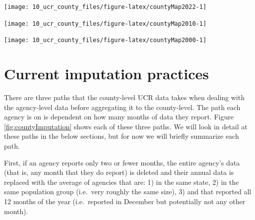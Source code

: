 \documentclass[
]{krantz}
\let\origfigure\figure
\let\endorigfigure\endfigure
\renewenvironment{figure}[1][2] {
    \expandafter\origfigure\expandafter[H]
} {
    \endorigfigure
}
\begin{document}
\begin{figure}

{\centering \texttt{[image: 10\_ucr\_county\_files/figure-latex/countyMap2022-1]} 

}

\caption{The share of the population in each county covered by an agency reporting 12 months of data based on their last month reported being December, 2022.}\label{fig:countyMap2022}
\end{figure}

\begin{figure}

{\centering \texttt{[image: 10\_ucr\_county\_files/figure-latex/countyMap2010-1]} 

}

\caption{The share of the population in each county covered by an agency reporting 12 months of data based on their last month reported being December, 2010.}\label{fig:countyMap2010}
\end{figure}

\begin{figure}

{\centering \texttt{[image: 10\_ucr\_county\_files/figure-latex/countyMap2000-1]} 

}

\caption{The share of the population in each county covered by an agency reporting 12 months of data based on their last month reported being December, 2000.}\label{fig:countyMap2000}
\end{figure}

\section{Current imputation
practices}\label{current-imputation-practices}

There are three paths that the county-level UCR data takes
when dealing with the agency-level data before aggregating
it to the county-level. The path each agency is on is
dependent on how many months of data they report. Figure
\ref{fig:countyImputation} shows each of these three paths.
We will look in detail at these paths in the below sections,
but for now we will briefly summarize each path.

First, if an agency reports only two or fewer months, the
entire agency's data (that is, any month that they do
report) is deleted and their annual data is replaced with
the average of agencies that are: 1) in the same state, 2)
in the same population group (i.e.~very roughly the same
size), 3) and that reported all 12 months of the year
(i.e.~reported in December but potentially not any other
month).
\end{document}

